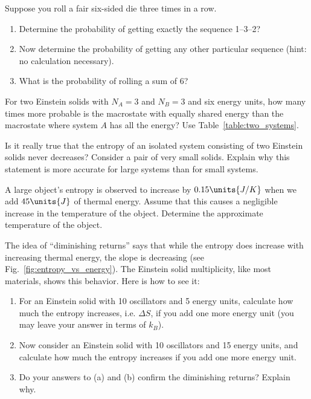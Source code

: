 \begin{problem}
Suppose you roll a fair six-sided die three times in a row.
\begin{enumerate}
\item Determine the probability of getting exactly the sequence 1--3--2?
\item Now determine the probability of getting any other particular
sequence (hint: no calculation necessary).
\item What is the probability of rolling a sum of 6?
\end{enumerate}
\label{prob:rolldie}
\end{problem}

\begin{problem}
  For two Einstein solids with $N_A=3$ and $N_B=3$ and six energy
  units, how many times more probable is the macrostate with equally
  shared energy than the macrostate where system $A$ has all the
  energy?  Use Table~\ref{table:two_systems}.
\label{prob:twosolids}
\end{problem}

\begin{problem}
Is it really true that the entropy of an isolated system consisting of
two Einstein solids never decreases?  Consider a pair of very small
solids.  Explain why this statement is more accurate for large systems
than for small systems.
\end{problem}

\begin{problem}
A large object's entropy is observed to increase by $0.15\units{J/K}$
when we add $45\units{J}$ of thermal energy.  Assume that this causes
a negligible increase in the temperature of the object.  Determine
the approximate temperature of the object.
\label{prob:tempoflargeobject}
\end{problem}

\begin{problem}
  The idea of ``diminishing returns'' says that while the entropy does
  increase with increasing thermal energy, the slope is decreasing
  (see Fig.~\ref{fig:entropy_vs_energy}).  The Einstein solid
  multiplicity, like most materials, shows this behavior.  Here is how
  to see it:
  \begin{enumerate}
  \item For an Einstein solid with 10 oscillators and 5 energy units,
    calculate how much the entropy increases, i.e. $\Delta S$, if you
    add one more energy unit (you may leave your answer in terms of
    $k_B$).
  \item Now consider an Einstein solid with 10 oscillators and 15
    energy units, and calculate how much the entropy increases if you
    add one more energy unit.
  \item Do your answers to (a) and (b) confirm the diminishing
    returns?  Explain why.
\end{enumerate}
\label{prob:diminishing}
\end{problem}

